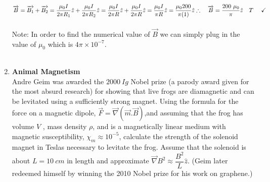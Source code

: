 \documentclass[fleqn]{article}
\begin{document}
\begin{enumerate}
{        $
          \overrightarrow{B}=\overrightarrow{B_1}+\overrightarrow{B_2}
          =\dfrac{\mu_0 I}{2 \pi R_1} \hat{z}+\dfrac{\mu_0 I}{2 \pi R_2} \hat{z}
          =\dfrac{\mu_0 I}{2 \pi R} \hat{z}+\dfrac{\mu_0 I}{2 \pi R} \hat{z}
          =\dfrac{\mu_0 I}{\pi R} \hat{z}
          =\dfrac{\mu_0 200}{\pi (1)} \hat{z}
          \\
          \\
          \\
          \therefore ~~~ \overrightarrow{B}=\dfrac{200 ~ \mu_0}{\pi} \hat{z} ~~~ T ~~~~ \checkmark
        $
        \\
        \\
        Note: In order to find the numerical value of $\overrightarrow{B}$ we can simply plug in the value of $\mu_0$ which is 
        $4 \pi \times 10^{-7}$. 
        \\
        \\
      }

    \item \textbf{Animal Magnetism}
    \\
    Andre Geim was awarded the $2000 ~ Ig$ Nobel prize (a parody award given for the most absurd research) for showing that live frogs are
    diamagnetic and can be levitated using a sufficiently strong magnet. Using the formula for the force on a magnetic dipole, 
    $\overrightarrow{F}=\overrightarrow{\nabla} \left(
      \overrightarrow{m}.\overrightarrow{B}
    \right)$,and assuming that the frog has volume $V$ , mass density $\rho$, and is a magnetically linear medium with 
    magnetic susceptibility, $\chi_m \approx 10^{-5}$, calculate the strength of the solenoid magnet in Teslas necessary to
    levitate the frog. Assume that the solenoid is about $L=10 ~ cm$ in
    length and approximate $\overrightarrow{\nabla} B^2 \approx \dfrac{B^2}{L} \hat{z}$. (Geim later redeemed himself
    by winning the 2010 Nobel prize for his work on graphene.)


\end{enumerate}
\end{document}
